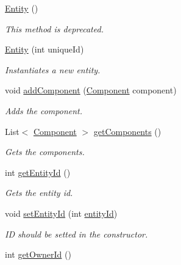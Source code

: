 \begin{DoxyCompactItemize}
\item 
\hyperlink{classbr_1_1unb_1_1unbomber_1_1core_1_1_entity_a327a249a220f4a88f5b1e5b4778f4cf4}{Entity} ()
\begin{DoxyCompactList}\small\item\em This method is deprecated. \end{DoxyCompactList}\item 
\hyperlink{classbr_1_1unb_1_1unbomber_1_1core_1_1_entity_ac81c6ff84e247d4f07ea50369c82d142}{Entity} (int unique\+Id)
\begin{DoxyCompactList}\small\item\em Instantiates a new entity. \end{DoxyCompactList}\item 
void \hyperlink{classbr_1_1unb_1_1unbomber_1_1core_1_1_entity_a4dcc0f5903b3ac4af4600fee95bb2328}{add\+Component} (\hyperlink{classbr_1_1unb_1_1unbomber_1_1core_1_1_component}{Component} component)
\begin{DoxyCompactList}\small\item\em Adds the component. \end{DoxyCompactList}\item 
List$<$ \hyperlink{classbr_1_1unb_1_1unbomber_1_1core_1_1_component}{Component} $>$ \hyperlink{classbr_1_1unb_1_1unbomber_1_1core_1_1_entity_aa3c56973895e2b1b0a5c2d8c48dfed56}{get\+Components} ()
\begin{DoxyCompactList}\small\item\em Gets the components. \end{DoxyCompactList}\item 
int \hyperlink{classbr_1_1unb_1_1unbomber_1_1core_1_1_entity_a7d600891c92aebdf3e1e1c16badf113e}{get\+Entity\+Id} ()
\begin{DoxyCompactList}\small\item\em Gets the entity id. \end{DoxyCompactList}\item 
void \hyperlink{classbr_1_1unb_1_1unbomber_1_1core_1_1_entity_a1cebc29bd7f488c01f59ae302316d58d}{set\+Entity\+Id} (int \hyperlink{classbr_1_1unb_1_1unbomber_1_1core_1_1_entity_aa5df23ec02ab11ec73f5e9a66dc682c8}{entity\+Id})
\begin{DoxyCompactList}\small\item\em I\+D should be setted in the constructor. \end{DoxyCompactList}\item 
int \hyperlink{classbr_1_1unb_1_1unbomber_1_1core_1_1_entity_a3f3a4fc359762fe375117933affaf4f7}{get\+Owner\+Id} ()

\end{DoxyCompactItemize}
